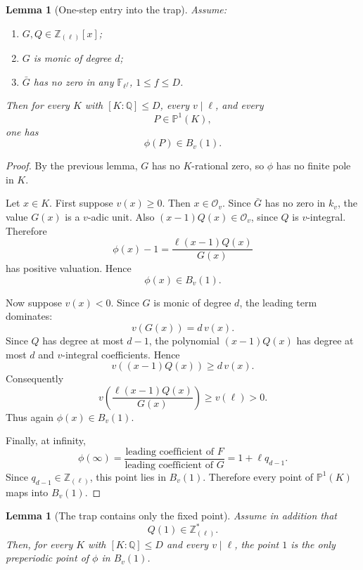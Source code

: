 \documentclass[11pt]{article}
\newtheorem{lemma}[theorem]{Lemma}
\begin{document}
\begin{lemma}[One-step entry into the trap]
Assume:
\begin{enumerate}
\item \(G,Q\in\mathbb Z_{(\ell)}[x]\);
\item \(G\) is monic of degree \(d\);
\item \(\bar G\) has no zero in any \(\mathbb F_{\ell^f}\), \(1\le f\le D\).
\end{enumerate}
Then for every \(K\) with \([K:\mathbb Q]\le D\), every \(v\mid\ell\), and every
\[
P\in\mathbb P^1(K),
\]
one has
\[
\phi(P)\in B_v(1).
\]
\end{lemma}

\begin{proof}
By the previous lemma, \(G\) has no \(K\)-rational zero, so \(\phi\) has no finite pole in \(K\).

Let \(x\in K\). First suppose \(v(x)\ge0\). Then \(x\in\mathcal O_v\). Since \(\bar G\) has no zero in \(k_v\), the value \(G(x)\) is a \(v\)-adic unit. Also \((x-1)Q(x)\in\mathcal O_v\), since \(Q\) is \(v\)-integral. Therefore
\[
\phi(x)-1=\frac{\ell(x-1)Q(x)}{G(x)}
\]
has positive valuation. Hence
\[
\phi(x)\in B_v(1).
\]

Now suppose \(v(x)<0\). Since \(G\) is monic of degree \(d\), the leading term dominates:
\[
v(G(x))=d\,v(x).
\]
Since \(Q\) has degree at most \(d-1\), the polynomial \((x-1)Q(x)\) has degree at most \(d\) and \(v\)-integral coefficients. Hence
\[
v((x-1)Q(x))\ge d\,v(x).
\]
Consequently
\[
v\left(\frac{\ell(x-1)Q(x)}{G(x)}\right)\ge v(\ell)>0.
\]
Thus again \(\phi(x)\in B_v(1)\).

Finally, at infinity,
\[
\phi(\infty)=
\frac{\text{leading coefficient of }F}{\text{leading coefficient of }G}
=1+\ell q_{d-1}.
\]
Since \(q_{d-1}\in\mathbb Z_{(\ell)}\), this point lies in \(B_v(1)\). Therefore every point of \(\mathbb P^1(K)\) maps into \(B_v(1)\).
\end{proof}

\begin{lemma}[The trap contains only the fixed point]
Assume in addition that
\[
Q(1)\in\mathbb Z_{(\ell)}^\ast.
\]
Then, for every \(K\) with \([K:\mathbb Q]\le D\) and every \(v\mid\ell\), the point \(1\) is the only preperiodic point of \(\phi\) in \(B_v(1)\).
\end{lemma}
\end{document}
